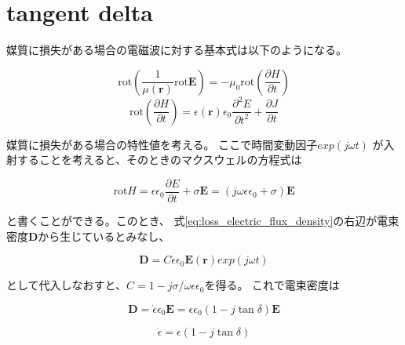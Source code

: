 \documentclass[a4paper,11pt]{jsarticle}
\begin{document}
\title{}
\author{}
\date{\today}
\maketitle

\section{tangent delta}

媒質に損失がある場合の電磁波に対する基本式は以下のようになる。

\begin{equation}
  \mathrm{rot}(\frac{1}{\mu(\boldsymbol{r})}\mathrm{rot}\boldsymbol{E}) = -\mu_0 \mathrm{rot}(\frac{\partial H}{\partial t})
\end{equation}
\begin{equation}
  \mathrm{rot}(\frac{\partial H}{\partial t}) = \epsilon(\boldsymbol{r})\epsilon_0 \frac{\partial^2 E}{\partial t^2} + \frac{\partial J}{\partial t}
\end{equation}


媒質に損失がある場合の特性値を考える。
ここで時間変動因子$exp(j\omega t)$ が入射することを考えると、そのときのマクスウェルの方程式は

\begin{equation} \label{eq:loss_electric_flux_density}
  \mathrm{rot} H = \epsilon \epsilon_0 \frac{\partial E}{\partial t} + \sigma \boldsymbol{E} = (j\omega\epsilon\epsilon_0 + \sigma)\boldsymbol{E}
\end{equation}

と書くことができる。このとき、
式\ref{eq:loss_electric_flux_density}の右辺が電束密度$\boldsymbol{D}$から生じているとみなし、

\begin{equation} \label{eq:electric_flux_density}
  \boldsymbol{D} = C\epsilon \epsilon_0 \boldsymbol{E}(\boldsymbol{r})exp(j\omega t)
\end{equation}

として代入しなおすと、$C=1 - j\sigma / \omega\epsilon\epsilon_0$を得る。
これで電束密度は

\begin{equation} \label{eq:electric_flux_density_tangent_delta}
  \boldsymbol{D} = \dot{\epsilon} \epsilon_0 \boldsymbol{E} = \epsilon \epsilon_0 (1 - j\tan\delta)\boldsymbol{E}
\end{equation}

\begin{equation} \label{eq:epsilon_dot}
  \dot{\epsilon} = \epsilon (1 - j\tan\delta)
\end{equation}
\end{document}
